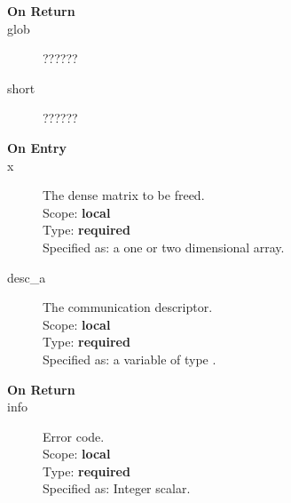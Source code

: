 \begin{description}
\item[\bf On Return]
\item[glob] ??????
\item[short] ??????
\end{description}


%
%


\begin{description}
\item[\bf On Entry]
\item[x] The dense matrix to
  be freed.\\
Scope: {\bf local} \\
Type: {\bf required}\\
Specified as: a one or two dimensional array.
\item[desc\_a] The communication descriptor.\\
Scope: {\bf local} \\
Type: {\bf required}\\
Specified as: a variable of type \descdata.\\
\end{description}

\begin{description}
\item[\bf On Return]
\item[info] Error code.\\
Scope: {\bf local} \\
Type: {\bf required}\\
Specified as: Integer scalar.\\
\end{description}


%
%


